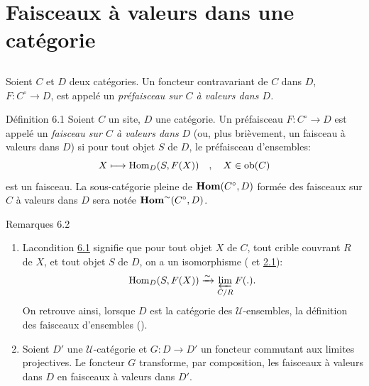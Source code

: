 \documentclass[10pt]{../fichiers-configuration-latex/smfart}
\begin{document}
\section{Faisceaux à valeurs dans une catégorie}

\setcounter{subsection}{-1}
\subsection{}
Soient $C$ et $D$ deux catégories. Un foncteur contravariant de
$C$ dans $D$, $F:C^{\circ}\rightarrow D$, est appelé un
\emph{préfaisceau sur $C$ à valeurs dans $D$.}

\begin{enonce*}{Définition 6.1}
Soient $C$ un site, $D$ une catégorie. Un préfaisceau
$F:C^{\circ}\rightarrow D$ est appelé un \emph{faisceau sur $C$ à
valeurs dans} $D$ (ou, plus brièvement, un faisceau à valeurs dans
$D$) si pour tout objet $S$ de $D$, le préfaisceau d'ensembles:
$$
X\longmapsto \operatorname{Hom}_D(S,F(X))\quad,\quad X\in \operatorname{ob}(C)
$$
est un faisceau. La sous-catégorie pleine de $\operatorname{\mathbf{Hom}}(C^{\circ},D)$
formée des faisceaux sur $C$ à valeurs dans $D$ sera notée
$\operatorname{\mathbf{Hom}}^{\sim}(C^{\circ},D)$.
\end{enonce*}

\begin{enonce*}[remark]{Remarques 6.2}
\begin{enumerate}
\renewcommand{\labelenumi}{\theenumi)}
\item La\pageoriginale condition \hyperref[II.def6.1]{6.1} signifie que pour
  tout objet $X$
  de $C$, tout crible couvrant $R$ de $X$, et tout objet $S$ de $D$,
  on a un isomorphisme ( et \hyperref[II.def2.1]{2.1}):
$$
\operatorname{Hom}_D(S,F(X))\xrightarrow{\sim}\varprojlim_{C/R}F(.){}.
$$
On retrouve ainsi, lorsque $D$ est la catégorie des
$𝒰$-ensembles, la définition des faisceaux d'ensembles
(\loccit).

\item Soient $D'$ une $𝒰$-catégorie et $G:D\rightarrow D'$
  un foncteur commutant aux limites projectives. Le foncteur $G$
  transforme, par composition, les faisceaux à valeurs dans $D$ en
  faisceaux à valeurs dans $D'$.
\end{enumerate}
\end{enonce*}

\setcounter{subsection}{3} \setcounter{subsubsection}{-1}
\end{document}
